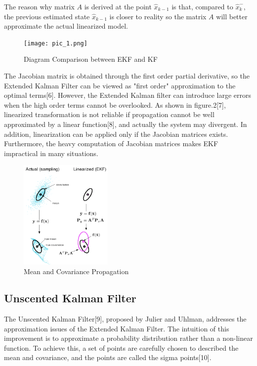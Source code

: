 \documentclass[10pt,twocolumn,letterpaper]{article}
\begin{document}
The reason why matrix $A$ is derived at the point $\hat{x}_{k-1}$ is that, compared to $\hat{x}_k^-$, the previous estimated state $\hat{x}_{k-1}$ is closer to reality so the matrix $A$ will better approximate the actual linearized model.

\begin{figure}
     \centering
       \texttt{[image: pic\_1.png]}
         \caption{\small{Diagram Comparison between EKF and KF}}
 \end{figure}

The Jacobian matrix is obtained through the first order partial derivative, so the Extended Kalman Filter can be viewed as "first order" approximation to the optimal terms[6]. However, the Extended Kalman filter can introduce large errors when the high order terms cannot be overlooked. As shown in figure.2[7], linearized transformation is not reliable if propagation cannot be well approximated by a linear function[8], and actually the system may divergent. In addition, linearization can be applied only if the Jacobian matrices exists. Furthermore, the heavy computation of Jacobian matrices makes EKF impractical in many situations.

\begin{figure}
     \centering
       \includegraphics[width=0.4\textwidth]{pic_2.png}
        \caption{\small{Mean and Covariance Propagation}}
 \end{figure}

\subsection{Unscented Kalman Filter}

The Unscented Kalman Filter[9], proposed by Julier and Uhlman, addresses the approximation issues of the Extended Kalman Filter. The intuition of this improvement is to approximate a probability distribution rather than a non-linear function. To achieve this, a set of points are carefully chosen to described the mean and covariance, and the points are called the sigma points[10].
\end{document}
